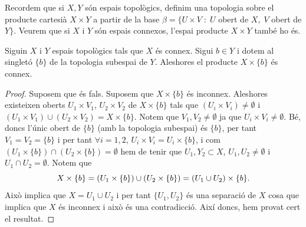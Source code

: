 \documentclass[../main.tex]{subfiles}
\begin{document}
Recordem que si $X,Y$ són espais topològics, definim una topologia sobre el producte cartesià $X\times Y$ a partir de la base $\beta = \{U\times V\;:\;U$ obert de $X,\;V$ obert de $Y\}$. Veurem que si $X$ i $Y$ són espais connexos, l'espai producte $X\times Y$ també ho és.

\begin{prop}
\label{prop:espaiproducteconnex1} Siguin $X$ i $Y$ espais topològics tals que $X$ és connex. Sigui $b\in Y$ i dotem al singletó $\{b\}$ de la topologia subespai de $Y$. Aleshores el producte $X\times \{b\}$ és connex.
\end{prop}
\begin{proof}
Suposem que és fals. Suposem que $X\times \{b\}$ és inconnex. Aleshores existeixen oberts $U_1\times V_1$, $U_2\times V_2$ de $X\times \{b\}$ tals que $(U_i\times V_i)\not=\emptyset$ i $(U_1\times V_1)\cup (U_2\times V_2) = X\times \{b\}$. Notem que $V_1,V_2\not=\emptyset$ ja que $U_i\times V_i\not=\emptyset$. Bé, doncs l'únic obert de $\{b\}$ (amb la topologia subespai) és $\{b\}$, per tant $V_1=V_2=\{b\}$ i per tant $\forall i=1,2$, $U_i\times V_i = U_i\times \{b\}$, i com $(U_1\times\{b\})\cap (U_2\times\{b\}) = \emptyset$ hem de tenir que $U_1,Y_2\subset X$, $U_1,U_2\not=\emptyset$ i $U_1\cap U_2 = \emptyset$. Notem que
\begin{equation}
    \notag
    X\times \{b\} = (U_1\times\{b\})\cup(U_2\times \{b\}) = (U_1\cup U_2)\times\{b\} .
\end{equation}
Això implica que $X = U_1\cup U_2$ i per tant $\{U_1,U_2\}$ és una separació de $X$ cosa que implica que $X$ és inconnex i això és una contradicció. Així doncs, hem provat cert el resultat.
\end{proof}
\end{document}
